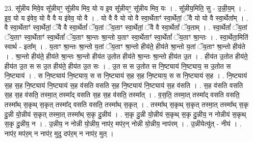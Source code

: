 \documentclass[17pt]{extarticle}
\begin{document}
23. सू᳚न्नीय मिवे॒व सू᳚न्नीयꣳ॒॒ सू᳚न्नीय मिव॒ यो य इ॒व सू᳚न्नीयꣳ॒॒ सू᳚न्नीय मिव॒ यः । . सू᳚न्नीय॒मिति॒ सु - उ॒न्नी॒य॒म् । . इ॒व॒ यो य इ॑वेव॒ यो वै वै य इ॑वेव॒ यो वै । . यो वै वै यो यो वै स्वा॒र्थेताꣳ॑ स्वा॒र्थेतां॒ ॅवै यो यो वै स्वा॒र्थेता᳚म् । . वै स्वा॒र्थेताꣳ॑ स्वा॒र्थेतां॒ ॅवै वै स्वा॒र्थेतां᳚ ॅय॒तां ॅय॒ताꣳ स्वा॒र्थेतां॒ ॅवै वै स्वा॒र्थेतां᳚ ॅय॒ताम् । . स्वा॒र्थेतां᳚ ॅय॒तां ॅय॒ताꣳ स्वा॒र्थेताꣳ॑ स्वा॒र्थेतां᳚ ॅय॒ताꣳ श्रा॒न्तः श्रा॒न्तो य॒ताꣳ स्वा॒र्थेताꣳ॑ स्वा॒र्थेतां᳚ ॅय॒ताꣳ श्रा॒न्तः । . स्वा॒र्थेता॒मिति॑ स्वार्थ - इता᳚म् । . य॒ताꣳ श्रा॒न्तः श्रा॒न्तो य॒तां ॅय॒ताꣳ श्रा॒न्तो हीय॑ते॒ हीय॑ते श्रा॒न्तो य॒तां ॅय॒ताꣳ श्रा॒न्तो हीय॑ते । . श्रा॒न्तो हीय॑ते॒ हीय॑ते श्रा॒न्तः श्रा॒न्तो हीय॑त उ॒तोत हीय॑ते श्रा॒न्तः श्रा॒न्तो हीय॑त उ॒त । . हीय॑त उ॒तोत हीय॑ते॒ हीय॑त उ॒त स स उ॒त हीय॑ते॒ हीय॑त उ॒त सः । . उ॒त स स उ॒तोत स नि॒ष्ट्याय॑ नि॒ष्ट्याय॒ स उ॒तोत स नि॒ष्ट्याय॑ । . स नि॒ष्ट्याय॑ नि॒ष्ट्याय॒ स स नि॒ष्ट्याय॑ स॒ह स॒ह नि॒ष्ट्याय॒ स स नि॒ष्ट्याय॑ स॒ह । . नि॒ष्ट्याय॑ स॒ह स॒ह नि॒ष्ट्याय॑ नि॒ष्ट्याय॑ स॒ह व॑सति वसति स॒ह नि॒ष्ट्याय॑ नि॒ष्ट्याय॑ स॒ह व॑सति । . स॒ह व॑सति वसति स॒ह स॒ह व॑सति॒ तस्मा॒त् तस्मा᳚द् वसति स॒ह स॒ह व॑सति॒ तस्मा᳚त् । . व॒स॒ति॒ तस्मा॒त् तस्मा᳚द् वसति वसति॒ तस्मा᳚थ् स॒कृथ् स॒कृत् तस्मा᳚द् वसति वसति॒ तस्मा᳚थ् स॒कृत् । . तस्मा᳚थ् स॒कृथ् स॒कृत् तस्मा॒त् तस्मा᳚थ् स॒कृ दु॒न्नी यो॒न्नीय॑ स॒कृत् तस्मा॒त् तस्मा᳚थ् स॒कृ दु॒न्नीय॑ । . स॒कृ दु॒न्नी यो॒न्नीय॑ स॒कृथ् स॒कृ दु॒न्नीय॒ न नोन्नीय॑ स॒कृथ् स॒कृ दु॒न्नीय॒ न । . उ॒न्नीय॒ न नोन्नी यो॒न्नीय॒ नाप॑र॒ मप॑र॒न् नोन्नी यो॒न्नीय॒ नाप॑रम् । . उ॒न्नीयेत्यु॑त् - नीय॑ । . नाप॑र॒ मप॑र॒म् न नाप॑र॒ मुदु दप॑र॒म् न नाप॑र॒ मुत् । \newline
\end{document}
